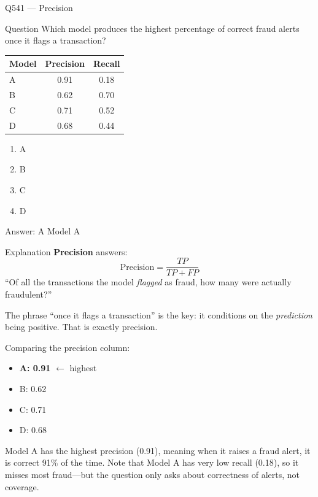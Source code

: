 \documentclass[aspectratio=169,8pt]{beamer}
\begin{document}
	\begin{frame}{Q541 --- Precision}
		\begin{block}{Question}
			Which model produces the highest percentage of correct fraud alerts once it flags a transaction?
			
			\begin{center}
				\begin{tabular}{lcc}
					\hline
					Model & Precision & Recall\\
					\hline
					A & 0.91 & 0.18\\
					B & 0.62 & 0.70\\
					C & 0.71 & 0.52\\
					D & 0.68 & 0.44\\
					\hline
				\end{tabular}
			\end{center}
			
			\begin{enumerate}
				\item A
				\item B
				\item C
				\item D
			\end{enumerate}
		\end{block}
		
		\begin{exampleblock}{Answer: A}
			Model A
		\end{exampleblock}
		
		\begin{block}{Explanation}
			\textbf{Precision} answers:
			\[
			\text{Precision} = \frac{TP}{TP+FP}
			\]
			``Of all the transactions the model \emph{flagged} as fraud, how many were
			actually fraudulent?''
			
			The phrase ``once it flags a transaction'' is the key: it conditions on the
			\emph{prediction} being positive. That is exactly precision.
			
			Comparing the precision column:
			\begin{itemize}
				\item \textbf{A: 0.91} \(\leftarrow\) highest
				\item B: 0.62
				\item C: 0.71
				\item D: 0.68
			\end{itemize}
			
			Model A has the highest precision (0.91), meaning when it raises a fraud alert,
			it is correct 91\% of the time. Note that Model A has very low recall (0.18),
			so it misses most fraud---but the question only asks about correctness of
			alerts, not coverage.
		\end{block}
		

\end{frame}
\end{document}
